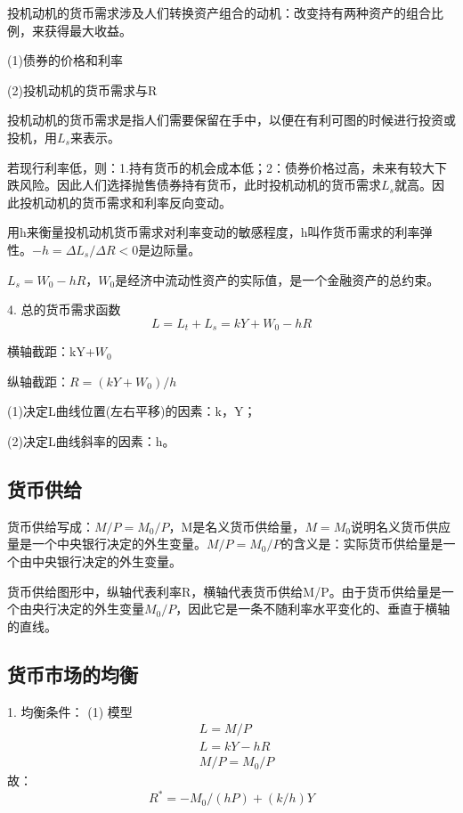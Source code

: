 \documentclass{article}
\begin{document}
投机动机的货币需求涉及人们转换资产组合的动机：改变持有两种资产的组合比例，来获得最大收益。

(1)债券的价格和利率

\hspace*{\fill}

(2)投机动机的货币需求与R

投机动机的货币需求是指人们需要保留在手中，以便在有利可图的时候进行投资或投机，用$ L_s $来表示。

若现行利率低，则：1.持有货币的机会成本低；2：债券价格过高，未来有较大下跌风险。因此人们选择抛售债券持有货币，此时投机动机的货币需求$ L_s $就高。因此投机动机的货币需求和利率反向变动。

用h来衡量投机动机货币需求对利率变动的敏感程度，h叫作货币需求的利率弹性。$ -h=\Delta L_s/\Delta R<0 $是边际量。

$ L_s=W_0-hR $，$ W_0 $是经济中流动性资产的实际值，是一个金融资产的总约束。

\hspace*{\fill}

4. 总的货币需求函数
\[
L=L_t+L_s=kY+W_0-hR
\]

横轴截距：kY+$ W_0 $

纵轴截距：$ R=(kY+W_0)/h $

\hspace*{\fill}

(1)决定L曲线位置(左右平移)的因素：k，Y；

(2)决定L曲线斜率的因素：h。

\subsection{货币供给}
货币供给写成：$ M/P=M_0/P $，M是名义货币供给量，$ M=M_0 $说明名义货币供应量是一个中央银行决定的外生变量。$ M/P=M_0/P $的含义是：实际货币供给量是一个由中央银行决定的外生变量。

货币供给图形中，纵轴代表利率R，横轴代表货币供给M/P。由于货币供给量是一个由央行决定的外生变量$ M_0/P $，因此它是一条不随利率水平变化的、垂直于横轴的直线。

\subsection{货币市场的均衡}
1. 均衡条件：
(1) 模型
\begin{equation*}
	\begin{split}
	&L=M/P\\
	&L=kY-hR\\
	&M/P=M_0/P
	\end{split}
\end{equation*}
故：
\[
R^*=-M_0/(hP)+(k/h)Y
\]
\end{document}
